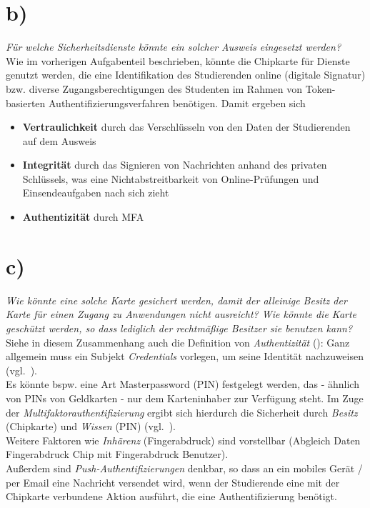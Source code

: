 \section{b)}
\textit{Für welche Sicherheitsdienste könnte ein solcher Ausweis eingesetzt werden?}\\

\noindent
Wie im vorherigen Aufgabenteil beschrieben, könnte die Chipkarte für Dienste genutzt werden, die eine Identifikation des Studierenden online (digitale Signatur) bzw. diverse Zugangsberechtigungen des Studenten im Rahmen von Token-basierten Authentifizierungsverfahren  benötigen.
Damit ergeben sich

\begin{itemize}
    \item \textbf{Vertraulichkeit} durch das Verschlüsseln von den Daten der Studierenden auf dem Ausweis
    \item \textbf{Integrität} durch das Signieren von Nachrichten anhand des privaten Schlüssels, was eine Nichtabstreitbarkeit von Online-Prüfungen und Einsendeaufgaben nach sich zieht
    \item \textbf{Authentizität} durch MFA
\end{itemize}

\section{c)}

\textit{Wie könnte eine solche Karte gesichert werden, damit der alleinige Besitz der
Karte für einen Zugang zu Anwendungen nicht ausreicht? Wie könnte die Karte  geschützt werden, so dass lediglich der rechtmäßige Besitzer sie benutzen kann?}\\

\noindent
Siehe in diesem Zusammenhang auch die Definition von \textit{Authentizität} (\cite[\textbf{Definition 1.4 (Authentizität)}, 8]{Eck18}): Ganz allgemein muss ein Subjekt \textit{Credentials} vorlegen, um  seine Identität nachzuweisen (vgl.~\cite[449]{Eck18}).\\
Es könnte bspw. eine Art Masterpassword (PIN) festgelegt werden, das - ähnlich von PINs von Geldkarten - nur dem Karteninhaber zur Verfügung steht.
Im Zuge der \textit{Multifaktorauthentifizierung} ergibt sich hierdurch die Sicherheit durch \textit{Besitz} (Chipkarte) und \textit{Wissen} (PIN) (vgl.~\cite[24]{ITS1}).\\
Weitere Faktoren wie \textit{Inhärenz} (Fingerabdruck) sind vorstellbar (Abgleich Daten Fingerabdruck Chip mit Fingerabdruck Benutzer).\\
Außerdem sind \textit{Push-Authentifizierungen} denkbar, so dass an ein mobiles Gerät / per Email eine Nachricht versendet wird, wenn der Studierende eine mit der Chipkarte verbundene Aktion ausführt, die eine Authentifizierung benötigt.\\

